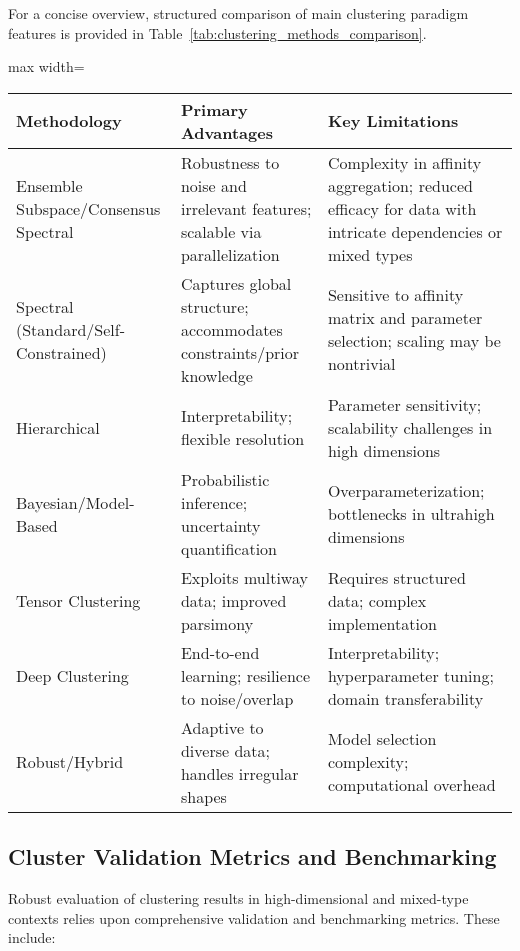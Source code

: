 For a concise overview, structured comparison of main clustering paradigm features is provided in Table~\ref{tab:clustering_methods_comparison}.

\begin{table*}[htbp]
\centering
\caption{Comparison of Principal Clustering Paradigms for High-Dimensional, Categorical, and Mixed Data}
\label{tab:clustering_methods_comparison}
\begin{adjustbox}{max width=\textwidth}
\begin{tabular}{lll}
\toprule
\textbf{Methodology} & \textbf{Primary Advantages} & \textbf{Key Limitations} \\
\midrule
Ensemble Subspace/Consensus Spectral & Robustness to noise and irrelevant features; scalable via parallelization & Complexity in affinity aggregation; reduced efficacy for data with intricate dependencies or mixed types \\
Spectral (Standard/Self-Constrained) & Captures global structure; accommodates constraints/prior knowledge & Sensitive to affinity matrix and parameter selection; scaling may be nontrivial \\
Hierarchical & Interpretability; flexible resolution & Parameter sensitivity; scalability challenges in high dimensions \\
Bayesian/Model-Based & Probabilistic inference; uncertainty quantification & Overparameterization; bottlenecks in ultrahigh dimensions \\
Tensor Clustering & Exploits multiway data; improved parsimony & Requires structured data; complex implementation \\
Deep Clustering & End-to-end learning; resilience to noise/overlap & Interpretability; hyperparameter tuning; domain transferability \\
Robust/Hybrid & Adaptive to diverse data; handles irregular shapes & Model selection complexity; computational overhead \\
\bottomrule
\end{tabular}
\end{adjustbox}
\end{table*}

\subsection{Cluster Validation Metrics and Benchmarking}

Robust evaluation of clustering results in high-dimensional and mixed-type contexts relies upon comprehensive validation and benchmarking metrics. These include:

